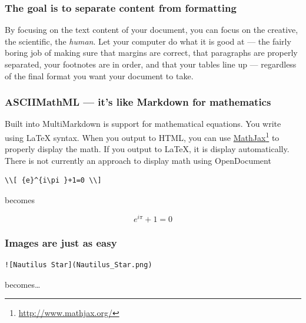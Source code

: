 \begin{frame}

\frametitle{The goal is to separate content from formatting}
\label{thegoalistoseparatecontentfromformatting}

By focusing on the text content of your document, you can focus on the
creative, the scientific, the \emph{human}. Let your computer do what it is good at
--- the fairly boring job of making sure that margins are correct, that
paragraphs are properly separated, your footnotes are in order, and that your
tables line up --- regardless of the final format you want your document to
take.

\end{frame}

\begin{frame}[fragile]

\frametitle{ASCIIMathML --- it's like Markdown for mathematics}
\label{asciimathml---itslikemarkdownformathematics}

Built into MultiMarkdown is support for mathematical equations. You write
using LaTeX syntax. When you output to HTML, you can use
\href{http://www.mathjax.org/}{MathJax}\footnote{\href{http://www.mathjax.org/}{http:/\slash www.mathjax.org\slash }} to properly display the math. If you output
to LaTeX, it is display automatically. There is not currently an approach to
display math using OpenDocument

\begin{verbatim}
\\[ {e}^{i\pi }+1=0 \\]
\end{verbatim}


becomes

\[ {e}^{i\pi }+1=0 \]

\end{frame}

\begin{frame}[fragile]

\frametitle{Images are just as easy}
\label{imagesarejustaseasy}

\begin{verbatim}
![Nautilus Star](Nautilus_Star.png)
\end{verbatim}


becomes{\ldots}

\end{frame}

